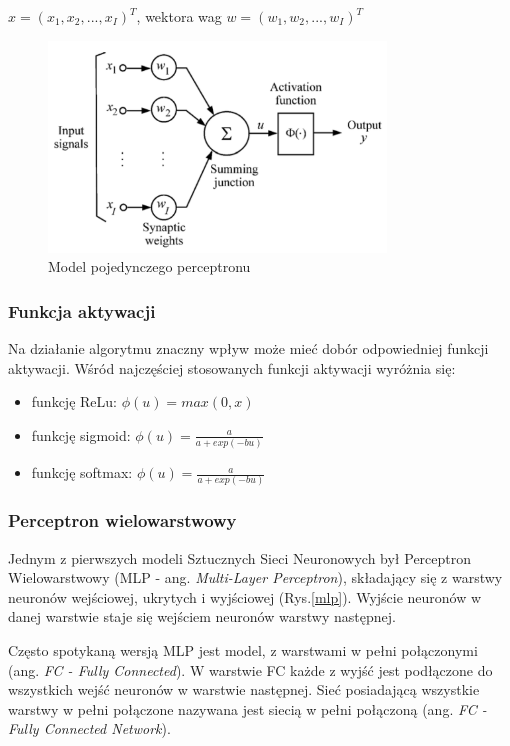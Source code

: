 $x = (x_1, x_2,...,x_I)^T$, wektora wag $w = (w_1, w_2,...,w_I)^T$ 

\begin{figure}[h]
  \centering
  \includegraphics[width=0.8\textwidth]{img/neuron.png}
  \caption{Model pojedynczego perceptronu}
  \label{neuron}
\end{figure}


\subsubsection{Funkcja aktywacji}
Na działanie algorytmu znaczny wpływ może mieć dobór odpowiedniej 
funkcji aktywacji. Wśród najczęściej stosowanych funkcji aktywacji
wyróżnia się:
\begin{itemize}
    \item funkcję ReLu: $\phi(u) = max(0, x)$
    \item funkcję sigmoid: $\phi(u) = \frac{a}{a + exp(-bu)}$
    \item funkcję softmax: $\phi(u) = \frac{a}{a + exp(-bu)}$
\end{itemize}

\subsubsection{Perceptron wielowarstwowy}
Jednym z pierwszych modeli Sztucznych Sieci Neuronowych był Perceptron
Wielowarstwowy (MLP - ang. \emph{Multi-Layer Perceptron}), składający 
się z warstwy neuronów wejściowej, ukrytych i wyjściowej (Rys.\ref{mlp}).
Wyjście neuronów w danej warstwie staje się wejściem neuronów warstwy następnej.

Często spotykaną wersją MLP jest model, z warstwami w pełni połączonymi
(ang. \emph{FC - Fully Connected}). W warstwie FC każde z wyjść jest podłączone do 
wszystkich wejść neuronów w warstwie następnej. Sieć posiadającą wszystkie warstwy
w pełni połączone nazywana jest siecią w pełni połączoną (ang. \emph{FC - Fully 
Connected Network}).

